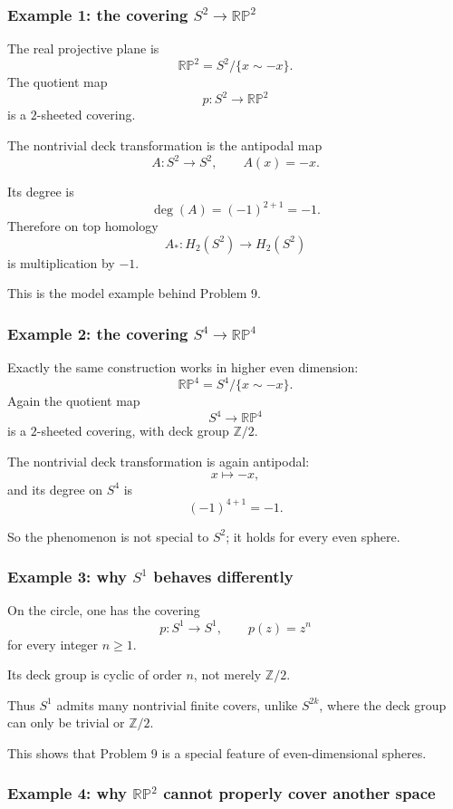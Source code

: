\documentclass[12pt,a4paper]{article}
\newcommand{\Z}{\mathbb{Z}}
\newcommand{\RP}{\mathbb{RP}}
\theoremstyle{notespace}
\begin{document}
\subsubsection*{Example 1: the covering \(S^2\to \RP^2\)}

The real projective plane is
\[
\RP^2=S^2/\{x\sim -x\}.
\]
The quotient map
\[
p:S^2\to \RP^2
\]
is a \(2\)-sheeted covering.

The nontrivial deck transformation is the antipodal map
\[
A:S^2\to S^2,\qquad A(x)=-x.
\]

Its degree is
\[
\deg(A)=(-1)^{2+1}=-1.
\]
Therefore on top homology
\[
A_*:H_2(S^2)\to H_2(S^2)
\]
is multiplication by \(-1\).

This is the model example behind Problem 9.

\subsubsection*{Example 2: the covering \(S^4\to \RP^4\)}

Exactly the same construction works in higher even dimension:
\[
\RP^4=S^4/\{x\sim -x\}.
\]
Again the quotient map
\[
S^4\to \RP^4
\]
is a \(2\)-sheeted covering, with deck group \(\Z/2\).

The nontrivial deck transformation is again antipodal:
\[
x\mapsto -x,
\]
and its degree on \(S^4\) is
\[
(-1)^{4+1}=-1.
\]

So the phenomenon is not special to \(S^2\); it holds for every even sphere.

\subsubsection*{Example 3: why \(S^1\) behaves differently}

On the circle, one has the covering
\[
p:S^1\to S^1,\qquad p(z)=z^n
\]
for every integer \(n\ge 1\).

Its deck group is cyclic of order \(n\), not merely \(\Z/2\).

Thus \(S^1\) admits many nontrivial finite covers, unlike \(S^{2k}\), where the deck group can only be trivial or \(\Z/2\).

This shows that Problem 9 is a special feature of even-dimensional spheres.

\subsubsection*{Example 4: why \(\RP^2\) cannot properly cover another space}
\end{document}
